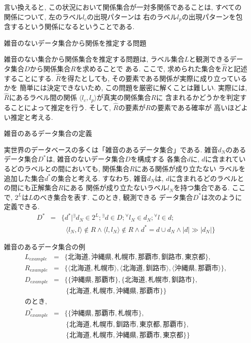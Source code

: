 言い換えると, この状況において関係集合が一対多関係であることは, 
すべての関係について, 左のラベル$l_c$の出現パターンは
右のラベル$l_p$の出現パターンを包含するという関係になるということである. 
\begin{df} 雑音のないデータ集合から関係を推定する問題

雑音のない集合から関係集合を推定する問題は, 
ラベル集合$L$と観測できるデータ集合$D$から関係集合$R$を求めることで
ある. 
ここで, 求められた集合を$\hat{R}$と記述することにする. 
$\hat{R}$を得たとしても, その要素である関係が実際に成り立っているかを
簡単には決定できないため, 
この問題を厳密に解くことは難しい. 
実際には, $\hat{R}$にあるラベル間の関係
$\langle l_c, l_p \rangle$が真実の関係集合$R$に
含まれるかどうかを判定することによって推定を行う. 
そして, $\hat{R}$の要素が$R$の要素である確率が
高いほどよい推定と考える. 
\end{df}
\begin{df} 雑音のあるデータ集合の定義\label{with-noise}

実世界のデータベースの多くは「雑音のあるデータ集合」である. 
雑音$d_N$のあるデータ集合$D^*$は, 雑音のないデータ集合$D$を構成する
各集合$d$に, $d$に含まれているどのラベルとの間においても, 
関係集合$R$にある関係が成り立たない
ラベルを追加した集合$d^*$の集合と考える. 
すなわち, 雑音$d_N$は, $d$に含まれるどのラベルとの間にも正解集合$R$にある
関係が成り立たないラベル$l_N$を持つ集合である.
ここで, $2^L$は$L$のべき集合を表す. このとき, 観測できる
データ集合$D^*$は次のように定義できる. 
\begin{eqnarray*}
 D^*&=&\{d^*|{}^{\exists} d_N\in 2^L; {}^\exists d \in D;
{}^\forall l_N\in d_N; {}^\forall l\in d; \\
&& 
\,\,\,\,
\langle l_N,l\rangle\not\in R \wedge \langle l,l_N\rangle\not\in R \wedge 
d^* = d \cup d_N \wedge |d|\gg |d_N |\}
\end{eqnarray*} 
\end{df}
\begin{ex} 雑音のあるデータ集合の例
\begin{eqnarray*}
L_{example} &=& \{ 北海道, 沖縄県, 札幌市, 那覇市, 釧路市, 東京都\}, \\
R_{example} &=& \{\langle 北海道, 札幌市\rangle, \langle 北海道, 釧路市\rangle, \langle 沖縄県, 那覇市\rangle \}, \\
D_{example} &=& \{\{沖縄県, 那覇市\}, \{北海道, 札幌市, 釧路市\}, \\ 
&& ~\{北海道, 札幌市, 沖縄県, 那覇市\} \} \\
のとき, &&\\
D^*_{example} &=& \{\{沖縄県, 那覇市, 札幌市\}, \\
&& ~\{北海道, 札幌市, 釧路市, 東京都, 那覇市\}, \\
&& ~\{北海道, 札幌市, 沖縄県, 那覇市, 東京都\} \}
\end{eqnarray*}
\end{ex}
